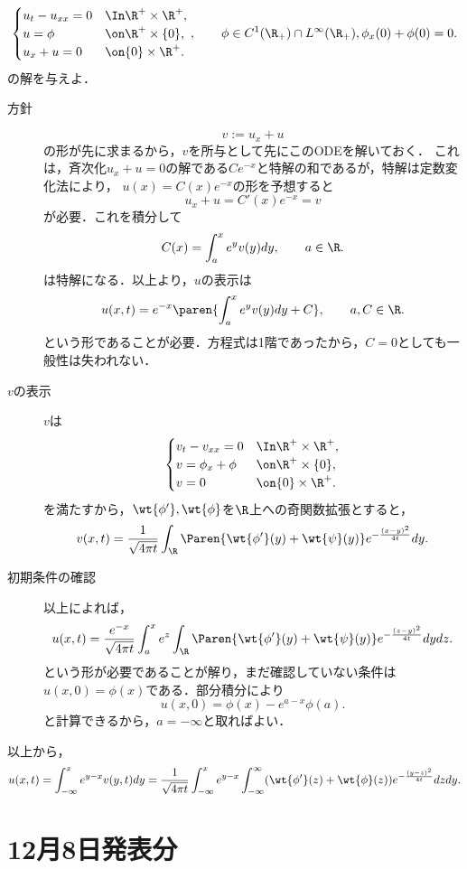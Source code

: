 \documentclass[uplatex,dvipdfmx]{jsarticle}
\begin{document}
\begin{problem}
    \[\begin{cases}
        u_t-u_{xx}=0&\In\R^+\times\R^+,\\
        u=\phi&\on\R^+\times\{0\},\\
        u_x+u=0&\on\{0\}\times\R^+.
    \end{cases},\qquad\phi\in C^1(\R_+)\cap L^\infty(\R_+),\phi_x(0)+\phi(0)=0.\]
    の解を与えよ．
\end{problem}
\begin{Proof}\mbox{}
    \begin{description}
        \item[方針] \[v:=u_x+u\]
        の形が先に求まるから，$v$を所与として先にこのODEを解いておく．
        これは，斉次化$u_x+u=0$の解である$Ce^{-x}$と特解の和であるが，特解は定数変化法により，
        $u(x)=C(x)e^{-x}$の形を予想すると
        \[u_x+u=C'(x)e^{-x}=v\]
        が必要．これを積分して
        \[C(x)=\int^x_ae^{y}v(y)dy,\qquad a\in\R.\]
        は特解になる．以上より，$u$の表示は
        \[u(x,t)=e^{-x}\paren{\int^x_ae^{y}v(y)dy+C},\qquad a,C\in\R.\]
        という形であることが必要．方程式は1階であったから，$C=0$としても一般性は失われない．
        \item[$v$の表示] $v$は
        \[\begin{cases}
            v_t-v_{xx}=0&\In\R^+\times\R^+,\\
            v=\phi_x+\phi&\on\R^+\times\{0\},\\
            v=0&\on\{0\}\times\R^+.
        \end{cases}\]
        を満たすから，$\wt{\phi'},\wt{\phi}$を$\R$上への奇関数拡張とすると，
        \[v(x,t)=\frac{1}{\sqrt{4\pi t}}\int_\R\Paren{\wt{\phi'}(y)+\wt{\psi}(y)}e^{-\frac{(x-y)^2}{4t}}dy.\]
        \item[初期条件の確認] 以上によれば，
        \[u(x,t)=\frac{e^{-x}}{\sqrt{4\pi t}}\int^x_ae^z\int_\R \Paren{\wt{\phi'}(y)+\wt{\psi}(y)}e^{-\frac{(z-y)^2}{4t}}dydz.\]
        という形が必要であることが解り，まだ確認していない条件は$u(x,0)=\phi(x)$である．部分積分により
        \[u(x,0)=\phi(x)-e^{a-x}\phi(a).\]
        と計算できるから，$a=-\infty$と取ればよい．
    \end{description}
    以上から，
    \[u(x,t)=\int^x_{-\infty}e^{y-x}v(y,t)dy=\frac{1}{\sqrt{4\pi t}}\int^x_{-\infty}e^{y-x}\int^\infty_{-\infty}(\wt{\phi'}(z)+\wt{\phi}(z))e^{-\frac{(y-z)^2}{4t}}dzdy.\]
\end{Proof}

\section{12月8日発表分}
\end{document}
